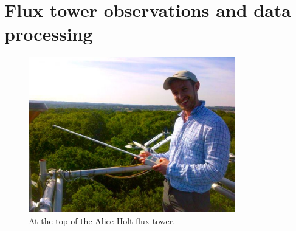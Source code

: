 \documentclass[11pt]{article}
\begin{document}
\section{Flux tower observations and data processing}

\begin{figure}[ht]
    \centering
    \includegraphics[width=0.8\textwidth]{top_of_flux.pdf}
    \caption{At the top of the Alice Holt flux tower.} \label{fig:flux_me}
\end{figure}

{}
\end{document}
